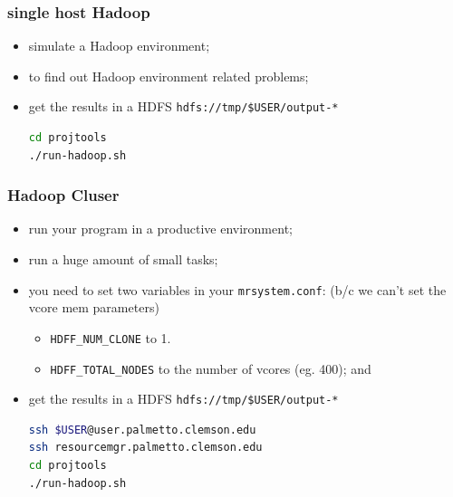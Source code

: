 \documentclass{beamer}
\theoremstyle{definition}
\theoremstyle{remark}
\begin{document}
\begin{frame}[fragile]
  \frametitle<presentation>{single host Hadoop}

    \begin{itemize}
      \item simulate a Hadoop environment;
      \item to find out Hadoop environment related problems;

      \item get the results in a HDFS \texttt{hdfs://tmp/\${USER}/output-*}
\begin{lstlisting}[language=bash]
cd projtools
./run-hadoop.sh
\end{lstlisting}
    \end{itemize}

\end{frame}



\begin{frame}[fragile]
  \frametitle<presentation>{Hadoop Cluser}

    \begin{itemize}
      \item run your program in a productive environment;
      \item run a huge amount of small tasks;
      \item you need to set two variables in your \texttt{mrsystem.conf}: (b/c we can't set the vcore mem parameters)
        \begin{itemize}
          \item \texttt{HDFF\_NUM\_CLONE} to 1.
          \item \texttt{HDFF\_TOTAL\_NODES} to the number of vcores (eg. 400); and
        \end{itemize}

      \item get the results in a HDFS \texttt{hdfs://tmp/\${USER}/output-*}
\begin{lstlisting}[language=bash]
ssh $USER@user.palmetto.clemson.edu
ssh resourcemgr.palmetto.clemson.edu
cd projtools
./run-hadoop.sh
\end{lstlisting}
    \end{itemize}

\end{frame}
\end{document}
